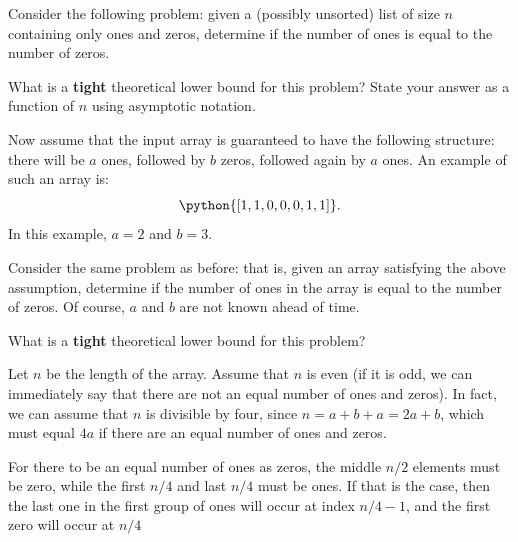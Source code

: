 \begin{prob}[(2 points)]
    Consider the following problem: given a (possibly unsorted) list of size
    $n$ containing only ones and zeros, determine if the number of ones is
    equal to the number of zeros.

    \begin{subprobset}

        \begin{subprob}
            What is a \textbf{tight} theoretical lower bound for this problem?
            State your answer as a function of $n$ using asymptotic notation.

        \end{subprob}

        \begin{subprob}
            Now assume that the input array is guaranteed to have the following structure:
            there will be $a$ ones, followed by $b$ zeros, followed again by $a$ ones.
            An example of such an array is:
            \[
                \python{[1, 1, 0, 0, 0, 1, 1]}.
            \]
            In this example, $a = 2$ and $b = 3$.

            Consider the same problem as before: that is, given an array
            satisfying the above assumption, determine if the number of ones in
            the array is equal to the number of zeros. Of course, $a$ and $b$
            are not known ahead of time.

            What is a \textbf{tight} theoretical lower bound for this problem?


            \begin{soln}
                Let $n$ be the length of the array.
                Assume that $n$ is even (if it is odd, we can immediately say that
                there are not an equal number of ones and zeros). In fact, we can assume
                that $n$ is divisible by four, since $n = a + b + a = 2a + b$, which
                must equal $4a$ if there are an equal number of ones and zeros.

                For there to be an equal number of ones as zeros, the middle
                $n/2$ elements must be zero, while the first $n/4$ and last
                $n/4$ must be ones. If that is the case, then the last one in
                the first group of ones will occur at index $n / 4 - 1$, and
                the first zero will occur at $n / 4 $


\end{soln}
\end{subprob}
\end{subprobset}
\end{prob}
